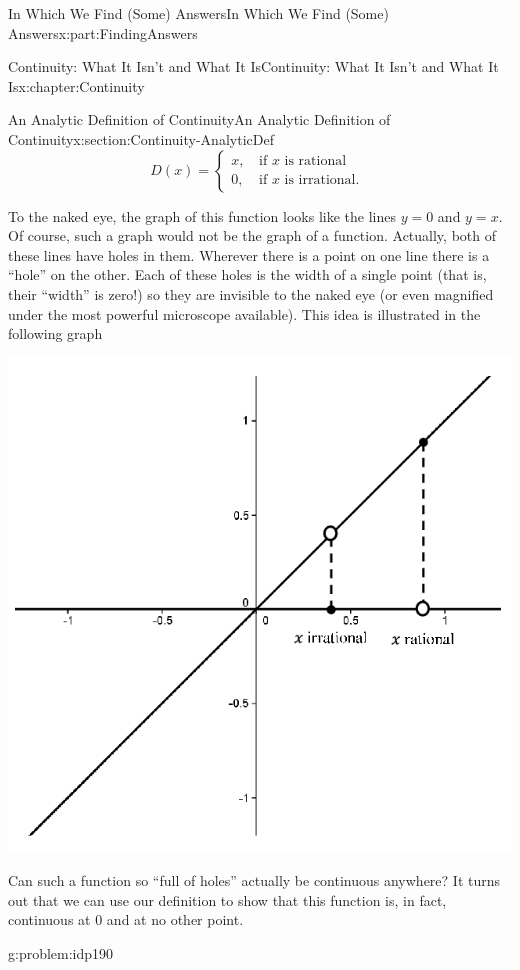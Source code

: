 \documentclass[oneside,10pt,]{book}
\numberwithin{equation}{section}
\newcommand{\amp}{&}
\begin{document}
\begin{partptx}{In Which We Find (Some) Answers}{}{In Which We Find (Some) Answers}{}{}{x:part:FindingAnswers}
\begin{chapterptx}{Continuity: What It Isn't and What It Is}{}{Continuity: What It Isn't and What It Is}{}{}{x:chapter:Continuity}
\begin{sectionptx}{An Analytic Definition of Continuity}{}{An Analytic Definition of Continuity}{}{}{x:section:Continuity-AnalyticDef}
\begin{equation*}
D(x)=
\left\{ 
\begin{matrix}
x\text{,} \amp \text{ if } x\text{ is rational } \\
0\text{,} \amp \text{ if } x\text{ is irrational. } 
\end{matrix}
\right.
\end{equation*}
\par
To the naked eye, the graph of this function looks like the lines \(y=0\) and \(y=x\).  Of course, such a graph would not be the graph of a function.  Actually, both of these lines have holes in them.  Wherever there is a point on one line there is a ``hole'' on the other.  Each of these holes is the width of a single point (that is, their ``width'' is zero!) so they are invisible to the naked eye (or even magnified under the most powerful microscope available).  This idea is illustrated in the following graph%
\begin{image}{0.2}{0.6}{0.2}%
\includegraphics[width=\linewidth]{images/Ch5fig5.png}
\end{image}%
Can such a function so ``full of holes'' actually be continuous anywhere?  It turns out that we can use our definition to show that this function is, in fact, continuous at \(0\) and at no other point.%
\begin{problem}{}{g:problem:idp190}%

\end{problem}
\end{sectionptx}
\end{chapterptx}
\end{partptx}
\end{document}
